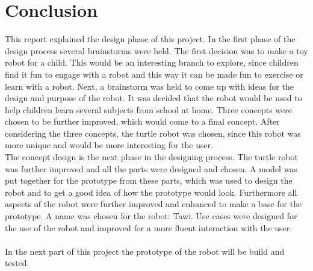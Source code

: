 \documentclass[11pt,twoside,a4paper]{report}
\begin{document}
\chapter{Conclusion}
This report explained the design phase of this project. In the first phase of the design process several brainstorms were held. The first decision was to make a toy robot for a child. This would be an interesting branch to explore, since children find it fun to engage with a robot and this way it can be made fun to exercise or learn with a robot.
Next, a brainstorm was held to come up with ideas for the design and purpose of the robot. It was decided that the robot would be used to help children learn several subjects from school at home. Three concepts were chosen to be further improved, which would come to a final concept. After considering the three concepts, the turtle robot was chosen, since this robot was more unique and would be more interesting for the user. \\
The concept design is the next phase in the designing process. The turtle robot was further improved and all the parts were designed and chosen. A model was put together for the prototype from these parts, which was used to design the robot and to get a good idea of how the prototype would look. Furthermore all aspects of the robot were further improved and enhanced to make a base for the prototype. A name was chosen for the robot: Tawi. Use cases were designed for the use of the robot and improved for a more fluent interaction with the user. \\
\\
In the next part of this project the prototype of the robot will be build and tested.
\end{document}
